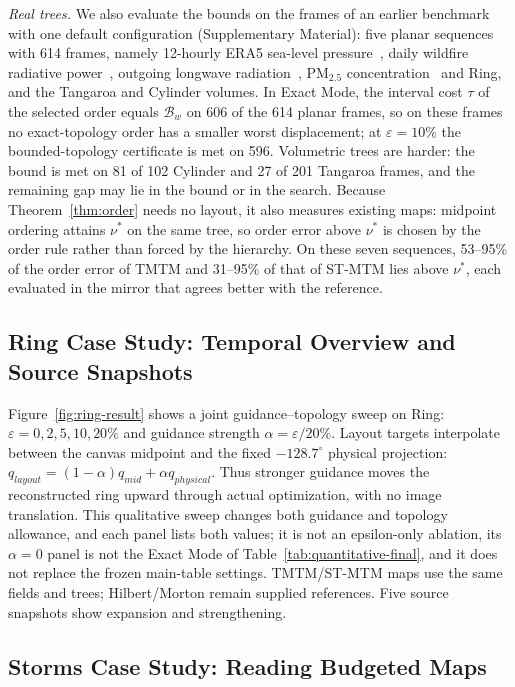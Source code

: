 \documentclass[review]{vgtc}
\begin{document}
\emph{Real trees.} We also evaluate the bounds on the frames of an earlier benchmark with one default configuration (Supplementary Material): five planar sequences with 614 frames, namely 12-hourly ERA5 sea-level pressure~\cite{Hersbach:2020:ERA5}, daily wildfire radiative power~\cite{Franke:2021:1DP}, outgoing longwave radiation~\cite{NOAA:OLR}, PM$_{2.5}$ concentration~\cite{Dong:2026:PM25} and Ring, and the Tangaroa and Cylinder volumes. In Exact Mode, the interval cost $\tau$ of the selected order equals $\mathcal{B}_w$ on 606 of the 614 planar frames, so on these frames no exact-topology order has a smaller worst displacement; at $\varepsilon=10\%$ the bounded-topology certificate is met on 596. Volumetric trees are harder: the bound is met on 81 of 102 Cylinder and 27 of 201 Tangaroa frames, and the remaining gap may lie in the bound or in the search. Because Theorem~\ref{thm:order} needs no layout, it also measures existing maps: midpoint ordering attains $\nu^*$ on the same tree, so order error above $\nu^*$ is chosen by the order rule rather than forced by the hierarchy. On these seven sequences, 53--95\% of the order error of TMTM and 31--95\% of that of ST-MTM lies above $\nu^*$, each evaluated in the mirror that agrees better with the reference.

\subsection{Ring Case Study: Temporal Overview and Source Snapshots}

Figure~\ref{fig:ring-result} shows a joint guidance--topology sweep on Ring: $\varepsilon=0,2,5,10,20\%$ and guidance strength $\alpha=\varepsilon/20\%$. Layout targets interpolate between the canvas midpoint and the fixed $-128.7^\circ$ physical projection: $q_{layout}=(1-\alpha)q_{mid}+\alpha q_{physical}$. Thus stronger guidance moves the reconstructed ring upward through actual optimization, with no image translation. This qualitative sweep changes both guidance and topology allowance, and each panel lists both values; it is not an epsilon-only ablation, its $\alpha=0$ panel is not the Exact Mode of Table~\ref{tab:quantitative-final}, and it does not replace the frozen main-table settings. TMTM/ST-MTM maps use the same fields and trees; Hilbert/Morton remain supplied references. Five source snapshots show expansion and strengthening.

\subsection{Storms Case Study: Reading Budgeted Maps}
\end{document}
